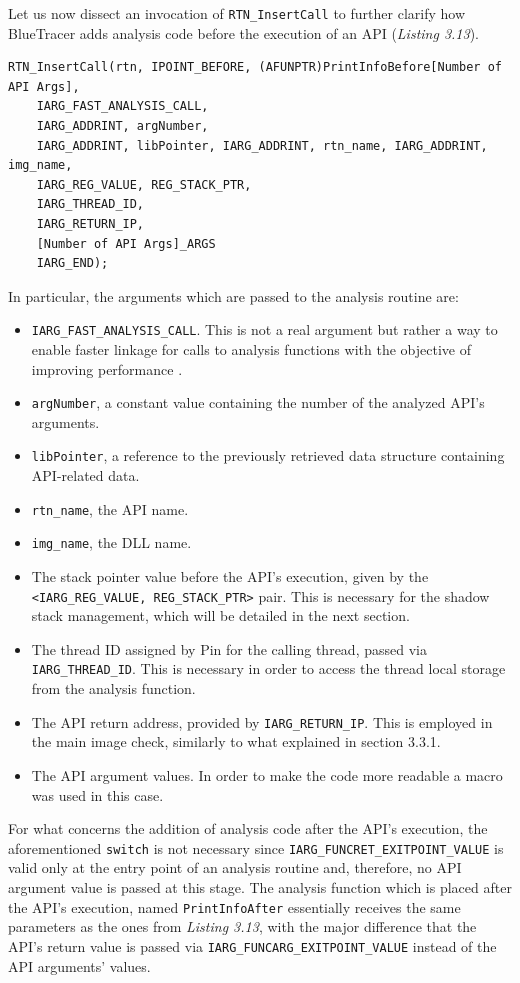 Let us now dissect an invocation of \texttt{RTN\_InsertCall} to further clarify how BlueTracer adds analysis code before the execution of an API (\textit{Listing 3.13}).  
\\
\begin{lstlisting}[caption={\texttt{RTN\_InsertCall} invocation to add analysis code before an API's execution},captionpos=b]
RTN_InsertCall(rtn, IPOINT_BEFORE, (AFUNPTR)PrintInfoBefore[Number of API Args],
 	IARG_FAST_ANALYSIS_CALL,
	IARG_ADDRINT, argNumber,
	IARG_ADDRINT, libPointer, IARG_ADDRINT, rtn_name, IARG_ADDRINT, img_name,
	IARG_REG_VALUE, REG_STACK_PTR,
	IARG_THREAD_ID,
	IARG_RETURN_IP,
	[Number of API Args]_ARGS
	IARG_END);
\end{lstlisting}

In particular, the arguments which are passed to the analysis routine are:
\begin{itemize}
\item \texttt{IARG\_FAST\_ANALYSIS\_CALL}. This is not a real argument but rather a way to enable faster linkage for calls to analysis functions with the objective of improving performance \cite{Pin}.
\item \texttt{argNumber}, a constant value containing the number of the analyzed API's arguments.
\item \texttt{libPointer}, a reference to the previously retrieved data structure containing API-related data.
\item \texttt{rtn\_name}, the API name.
\item \texttt{img\_name}, the DLL name.
\item The stack pointer value before the API's execution, given by the \texttt{<IARG\_REG\_VALUE, REG\_STACK\_PTR>} pair. This is necessary for the shadow stack management, which will be detailed in the next section.
\item The thread ID assigned by Pin for the calling thread, passed via \texttt{IARG\_THREAD\_ID}. This is necessary in order to access the thread local storage from the analysis function.
\item The API return address, provided by \texttt{IARG\_RETURN\_IP}. This is employed in the main image check, similarly to what explained in section 3.3.1.
\item The API argument values. In order to make the code more readable a macro was used in this case.
\end{itemize}

For what concerns the addition of analysis code after the API's execution, the aforementioned \texttt{switch} is not necessary since \texttt{IARG\_FUNCRET\_EXITPOINT\_VALUE} is valid only at the entry point of an analysis routine and, therefore, no API argument value is passed at this stage. The analysis function which is placed after the API's execution, named \texttt{PrintInfoAfter} essentially receives the same parameters as the ones from \textit{Listing 3.13}, with the major difference that the API's return value is passed via \texttt{IARG\_FUNCARG\_EXITPOINT\_VALUE} instead of the API arguments' values.


